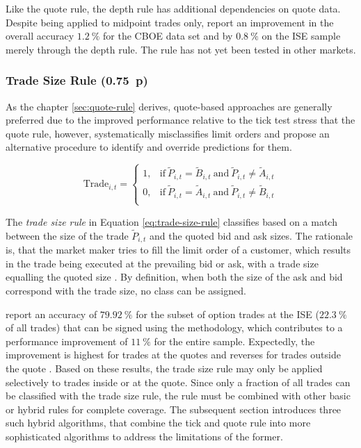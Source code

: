 Like the quote rule, the depth rule has additional dependencies on quote data. Despite being applied to midpoint trades only, \textcite[][4]{grauerOptionTradeClassification2022} report an improvement in the overall accuracy $1.2~\%$ for the CBOE data set and by $0.8~\%$ on the ISE sample merely through the depth rule. The rule has not yet been tested in other markets.

\subsubsection{Trade Size Rule (0.75~p)}\label{sec:trade-size-rule}

As the chapter \ref{sec:quote-rule} derives, quote-based approaches are generally preferred due to the improved performance relative to the tick test \textcite[][13]{grauerOptionTradeClassification2022} stress that the quote rule, however, systematically misclassifies limit orders and propose an alternative procedure to identify and override predictions for them.

\begin{equation}
  \text{Trade}_{i,t}=
  \begin{cases}
    1, & \text{if}\ \tilde{P}_{i, t} = \tilde{B}_{i, t}\ \text{and}\ \tilde{P}_{i, t} \neq \tilde{A}_{i, t} \\
    0, & \text{if}\ \tilde{P}_{i, t} = \tilde{A}_{i, t}\ \text{and}\ \tilde{P}_{i, t} \neq \tilde{B}_{i, t} \\
  \end{cases}
  \label{eq:trade-size-rule}
\end{equation}

The \emph{trade size rule} in Equation \ref{eq:trade-size-rule} classifies based on a match between the size of the trade $\tilde{P}_{i, t}$ and the quoted bid and ask sizes. The rationale is, that the market maker tries to fill the limit order of a customer, which results in the trade being executed at the prevailing bid or ask, with a trade size equalling the quoted size \textcite[][13]{grauerOptionTradeClassification2022}. By definition, when both the size of the ask and bid correspond with the trade size, no class can be assigned.

\textcite[][13]{grauerOptionTradeClassification2022} report an accuracy of $79.92~\%$ for the subset of option trades at the ISE ($22.3~\%$ of all trades) that can be signed using the methodology, which contributes to a performance improvement of $11~\%$ for the entire sample. Expectedly, the improvement is highest for trades at the quotes and reverses for trades outside the quote \textcite[][15]{grauerOptionTradeClassification2022}. Based on these results, the trade size rule may only be applied selectively to trades inside or at the quote. Since only a fraction of all trades can be classified with the trade size rule, the rule must be combined with other basic or hybrid rules for complete coverage. The subsequent section introduces three such hybrid algorithms, that combine the tick and quote rule into more sophisticated algorithms to address the limitations of the former.

